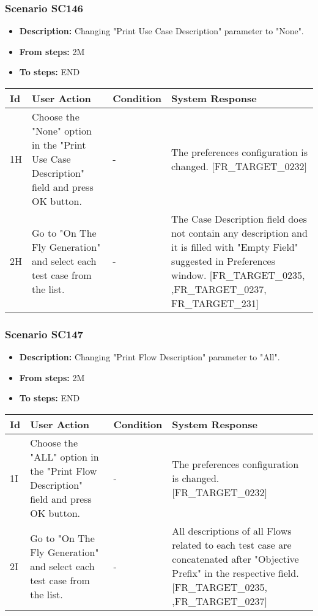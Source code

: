 \documentclass[a4paper,11pt]{article}
\newcommand{\bl}{\\ \hline}
\begin{document}
\subsubsection*{Scenario SC146}
\begin{itemize}
\item {\bf Description:} Changing "Print Use Case Description" parameter to
					"None".
\item {\bf From steps:} 2M
\item {\bf To steps:} END
\end{itemize}
\begin{tabular}{|p{0.4in}|p{1.5in}|p{1.5in}|p{1.5in}|}
\hline
Id & User Action & Condition & System Response \bl 
1H & Choose the "None" option in the "Print Use Case
						Description" field and press OK button. & - & The preferences configuration is changed.
						[FR_TARGET_0232]\bl
2H & Go to "On The Fly Generation" and select each test case
						from the list. & - & The Case Description field does not contain any
						description and it is filled with "Empty Field" suggested in
						Preferences window. [FR_TARGET_0235, ,FR_TARGET_0237,
						FR_TARGET_231]\bl
\end{tabular}
\subsubsection*{Scenario SC147}
\begin{itemize}
\item {\bf Description:} Changing "Print Flow Description" parameter to "All".
				
\item {\bf From steps:} 2M
\item {\bf To steps:} END
\end{itemize}
\begin{tabular}{|p{0.4in}|p{1.5in}|p{1.5in}|p{1.5in}|}
\hline
Id & User Action & Condition & System Response \bl 
1I & Choose the "ALL" option in the "Print Flow Description"
						field and press OK button. & - & The preferences configuration is changed.
						[FR_TARGET_0232]\bl
2I & Go to "On The Fly Generation" and select each test case
						from the list. & - & All descriptions of all Flows related to each test case
						are concatenated after "Objective Prefix" in the respective field.
						[FR_TARGET_0235, ,FR_TARGET_0237]\bl
\end{tabular}
\end{document}
